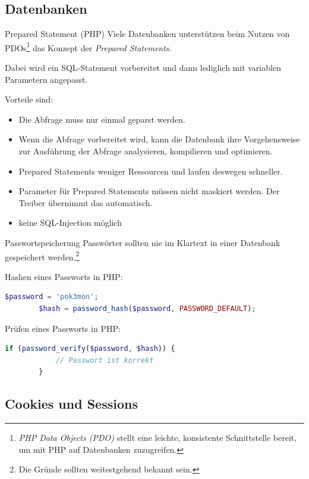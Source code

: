 \subsection{Datenbanken}

\begin{bonus}{Prepared Statement (PHP)}
    Viele Datenbanken unterstützen beim Nutzen von PDOs\footnote{\emph{PHP Data Objects (PDO)} stellt eine leichte, konsistente Schnittstelle bereit, um mit PHP auf Datenbanken zuzugreifen.} das Konzept der \emph{Prepared Statements}.

    Dabei wird ein SQL-Statement vorbereitet und dann lediglich mit variablen Parametern angepasst.

    Vorteile sind:
    \begin{itemize}
        \item Die Abfrage muss nur einmal geparst werden.
        \item Wenn die Abfrage vorbereitet wird, kann die Datenbank ihre Vorgehensweise zur Ausführung der Abfrage analysieren, kompilieren und optimieren.
        \item Prepared Statements weniger Ressourcen und laufen deswegen schneller.
        \item Parameter für Prepared Statements müssen nicht maskiert werden. Der Treiber übernimmt das automatisch.
        \item keine SQL-Injection möglich
    \end{itemize}
\end{bonus}

\begin{bonus}{Passwortspeicherung}
    Passwörter sollten nie im Klartext in einer Datenbank gespeichert werden.\footnote{Die Gründe sollten weitestgehend bekannt sein.}

    Hashen eines Passworts in PHP:
    \begin{lstlisting}[language=php]
        $password = 'pok3mon';
        $hash = password_hash($password, PASSWORD_DEFAULT);
    \end{lstlisting}

    Prüfen eines Passworts in PHP:
    \begin{lstlisting}[language=php]
        if (password_verify($password, $hash)) {
            // Passwort ist korrekt
        }
    \end{lstlisting}
\end{bonus}

\subsection{Cookies und Sessions}

